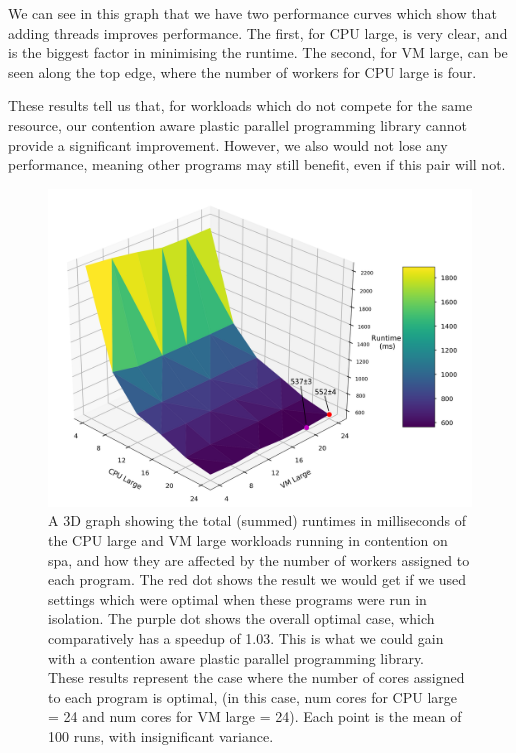 We can see in this graph that we have two performance curves which show that adding threads improves performance. The first, for CPU large, is very clear, and is the biggest factor in minimising the runtime. The second, for VM large, can be seen along the top edge, where the number of workers for CPU large is four. 

These results tell us that, for workloads which do not compete for the same resource, our contention aware plastic parallel programming library cannot provide a significant improvement. However, we also would not lose any performance, meaning other programs may still benefit, even if this pair will not.



\begin{figure}[H]
    \includegraphics[width=1\textwidth]{graphics/contention/spa/otwc_cpu_large_and_vm_large.png}
    \caption{A 3D graph showing the total (summed) runtimes in milliseconds of the CPU large and VM large workloads running in contention on spa, and how they are affected by the number of workers assigned to each program. The red dot shows the result we would get if we used settings which were optimal when these programs were run in isolation. The purple dot shows the overall optimal case, which comparatively has a speedup of 1.03. This is what we could gain with a contention aware plastic parallel programming library. \\
    These results represent the case where the number of cores assigned to each program is optimal, (in this case, num cores for CPU large = 24 and num cores for VM large = 24). Each point is the mean of 100 runs, with insignificant variance.}
    \label{fig:con_spa_cpu_large_and_vm_large}
\end{figure}



